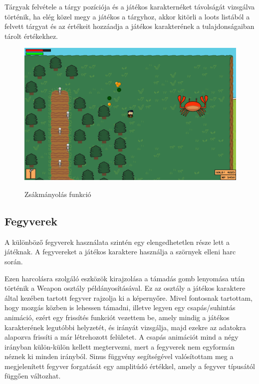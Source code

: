 Tárgyak felvétele a tárgy pozíciója és a játékos karakternéket távolságát vizsgálva történik, ha elég közel megy a játékos a tárgyhoz, akkor kitörli a loots listából a felvett tárgyat és az értékeit hozzáadja a játékos karakterének a tulajdonságaiban tárolt értékekhez.

\begin{figure}[H]
    \centering
    \includegraphics[width=15.5truecm]{images/loots.png}
    \caption{Zsákmányolás funkció}
    \label{fig:Zsákmányolás funkció}\cite{loot-sys}
\end{figure}


\subsection{Fegyverek}

\indent \indent A különböző fegyverek használata szintén egy elengedhetetlen része lett a játéknak. A fegyvereket a játékos karaktere használja a szörnyek elleni harc során. 

Ezen harcolásra szolgáló eszközök kirajzolása a támadás gomb lenyomása után történik a Weapon osztály példányosításával. Ez az osztály a játékos karaktere által kezében tartott fegyver rajzolja ki a képernyőre. Mivel fontosnak tartottam, hogy mozgás közben is lehessen támadni, illetve legyen egy csapás/suhintás animáció, ezért egy frissítés funkciót vezettem be, amely mindig a játékos karakterének legutóbbi helyzetét, és irányát vizsgálja, majd ezekre az adatokra alapozva frissíti a már létrehozott felületet. A csapás animációt mind a négy irányban külön-külön kellett megtervezni, mert a fegyverek nem egyformán néznek ki minden irányból. Sinus függvény segítségével valósítottam meg a megjelenített fegyver forgatását egy amplitúdó értékkel, amely a fegyver típusától függően változhat.

